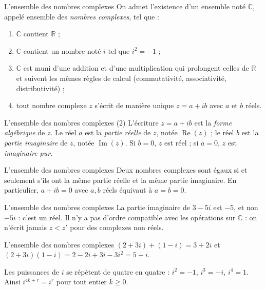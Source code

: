 \documentclass[aspectratio=169,10pt]{beamer}
\providecommand{\R}{\mathbb{R}}
\providecommand{\C}{\mathbb{C}}
\begin{document}
\begin{frame}{L'ensemble des nombres complexes}
On admet l'existence d'un ensemble noté \(\C\), appelé ensemble des \emph{nombres complexes}, tel que :

\begin{enumerate}
\setcounter{enumi}{0}
\item \(\C\) contient \(\R\) ;

\item \(\C\) contient un nombre noté \(i\) tel que \(i^2=-1\) ;

\item \(\C\) est muni d'une addition et d'une multiplication qui prolongent celles de \(\R\) et suivent les mêmes règles de calcul (commutativité, associativité, distributivité) ;

\item tout nombre complexe \(z\) s'écrit de manière unique \(z=a+ib\) avec \(a\) et \(b\) réels.

\end{enumerate}
\end{frame}
\begin{frame}{L'ensemble des nombres complexes (2)}
L'écriture \(z=a+ib\) est la \emph{forme algébrique} de \(z\). Le réel \(a\) est la \emph{partie réelle} de \(z\), notée \(\operatorname{Re}(z)\) ; le réel \(b\) est la \emph{partie imaginaire} de \(z\), notée \(\operatorname{Im}(z)\). Si \(b=0\), \(z\) est réel ; si \(a=0\), \(z\) est \emph{imaginaire pur}.
\end{frame}
\begin{frame}{L'ensemble des nombres complexes}
Deux nombres complexes sont égaux si et seulement s'ils ont la même partie réelle et la même partie imaginaire. En particulier, \(a+ib=0\) avec \(a,b\) réels équivaut à \(a=b=0\).
\end{frame}
\begin{frame}{L'ensemble des nombres complexes}
La partie imaginaire de \(3-5i\) est \(-5\), et non \(-5i\) : c'est un réel. Il n'y a pas d'ordre compatible avec les opérations sur \(\C\) : on n'écrit jamais \(z<z'\) pour des complexes non réels.
\end{frame}
\begin{frame}{L'ensemble des nombres complexes}
\((2+3i)+(1-i)=3+2i\) et \((2+3i)(1-i)=2-2i+3i-3i^2=5+i\).

Les puissances de \(i\) se répètent de quatre en quatre : \(i^2=-1\), \(i^3=-i\), \(i^4=1\). Ainsi \(i^{4k+r}=i^r\) pour tout entier \(k\ge0\).
\end{frame}
\end{document}
